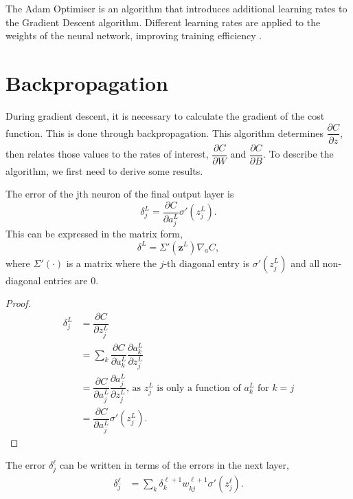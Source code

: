 The Adam Optimiser is an algorithm that introduces additional learning rates to the Gradient Descent algorithm. Different learning rates are applied to the weights of the neural network, improving training efficiency \cite{Kingma2014}.


\section{Backpropagation}\label{nnets-backprop}

During gradient descent, it is necessary to calculate the gradient of the cost function. This is done through backpropagation. This algorithm determines $\dfrac{\partial C}{\partial z}$, then relates those values to the rates of interest, $\dfrac{\partial C}{\partial W}$ and $\dfrac{\partial C}{\partial B}$. To describe the algorithm, we first need to derive some results.


\begin{proposition}
	The error of the jth neuron of the final output layer is
	\[
		\delta_j^L = \dfrac{\partial C}{\partial a_j^L}\sigma'(z_j^L).
	\]
	This can be expressed in the matrix form,
	\[
		\delta^L = \Sigma'(\mathbf{z}^L)\nabla_aC,
	\]
where $\Sigma'(\cdot)$ is a matrix where the $j$-th diagonal entry is $\sigma'(z_j^L)$ and all non-diagonal entries are 0.
\end{proposition}

\begin{proof}
	\begin{align*}
		\delta_j^L & = \dfrac{\partial C}{\partial z_j^L} \\
		& = \sum_k\dfrac{\partial C}{\partial a_k^L}\dfrac{\partial a_k^L}{\partial z_j^L} \\
		& = \dfrac{\partial C}{\partial a_j^L}\dfrac{\partial a_j^L}{\partial z_j^L}\text{, as }z_j^L\text{ is only a function of }a_k^L\text{ for }k = j \\
		& = \dfrac{\partial C}{\partial a_j^L}\sigma'(z_j^L).
	\end{align*}
\end{proof}

\begin{proposition}
	The error $\delta^\ell_j$ can be written in terms of the errors in the next layer, 
	\begin{align*}
		\delta_j^\ell & = \sum_k\delta_k^{\ell+1}w_{kj}^{\ell+1}\sigma'(z_j^\ell).
	\end{align*}
\end{proposition}

